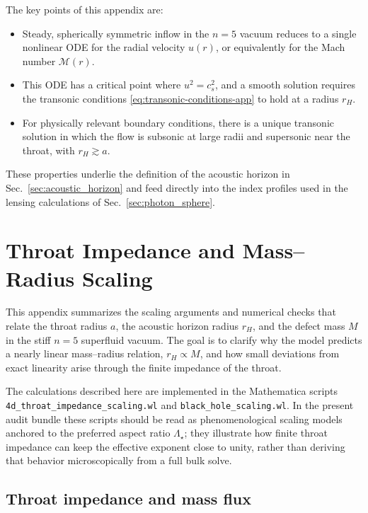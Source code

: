 \documentclass[11pt]{article}
\begin{document}
The key points of this appendix are:
\begin{itemize}
  \item Steady, spherically symmetric inflow in the \(n=5\) vacuum reduces
        to a single nonlinear ODE for the radial velocity \(u(r)\), or
        equivalently for the Mach number \(\mathcal{M}(r)\).
  \item This ODE has a critical point where \(u^2 = c_s^2\), and a smooth
        solution requires the transonic conditions
        \eqref{eq:transonic-conditions-app} to hold at a radius \(r_H\).
  \item For physically relevant boundary conditions, there is a unique
        transonic solution in which the flow is subsonic at large radii and
        supersonic near the throat, with \(r_H \gtrsim a\).
\end{itemize}
These properties underlie the definition of the acoustic horizon in
Sec.~\ref{sec:acoustic_horizon} and feed directly into the index profiles
used in the lensing calculations of Sec.~\ref{sec:photon_sphere}.

\section{Throat Impedance and Mass--Radius Scaling}
\label{app:impedance_scaling}

This appendix summarizes the scaling arguments and numerical checks that
relate the throat radius \(a\), the acoustic horizon radius \(r_H\), and the
defect mass \(M\) in the stiff \(n=5\) superfluid vacuum.  The goal is to
clarify why the model predicts a nearly linear mass--radius relation,
\(r_H \propto M\), and how small deviations from exact linearity arise
through the finite impedance of the throat.

The calculations described here are implemented in the Mathematica scripts\\
\texttt{4d\_throat\_impedance\_scaling.wl} and
\texttt{black\_hole\_scaling.wl}.  In the present audit bundle these scripts
should be read as phenomenological scaling models anchored to the preferred
aspect ratio \(\Lambda_\star\); they illustrate how finite throat impedance
can keep the effective exponent close to unity, rather than deriving that
behavior microscopically from a full bulk solve.

\subsection{Throat impedance and mass flux}
\label{app:impedance-mass-flux}
\end{document}
